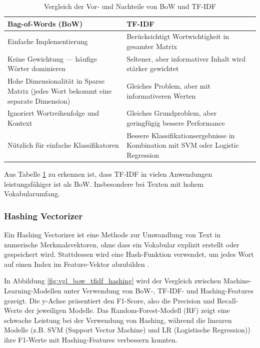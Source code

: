 \begin{table}[!ht]
    \centering
        \begin{tabular}{|p{6.6cm}|p{6.6cm}|}
            \hline
            \textbf{Bag-of-Words (BoW)} & \textbf{TF-IDF} \\
            \hline
            Einfache Implementierung \cite{cichosz2018forum} & Berücksichtigt Wortwichtigkeit in gesamter Matrix  \cite{elov2023uzbek} \\
            \hline
            Keine Gewichtung — häufige Wörter dominieren & Seltener, aber informativer Inhalt wird stärker gewichtet \cite{das2023tfidf} \\
            \hline
            Hohe Dimensionalität in Sparse Matrix (jedes Wort bekommt eine separate Dimension) \cite{ibm_bow} & Gleiches Problem, aber mit informativeren Werten \cite{alzami2020tfidf} \\
            \hline
            Ignoriert Wortreihenfolge und Kontext \cite{umar2022sentiment} & Gleiches Grundproblem, aber geringfügig bessere Performance \cite{parmar2024stacking} \\
            \hline
            Nützlich für einfache Klassifikatoren & Bessere Klassifikationsergebnisse in Kombination mit SVM oder Logistic Regression \cite{iyer2024sentiment} \\
            \hline
        \end{tabular}
    \caption{Vergleich der Vor- und Nachteile von BoW und TF-IDF}
    \label{tab:vergleich}
\end{table}

Aus Tabelle \ref{tab:vergleich} zu erkennen ist, dass TF-IDF in vielen Anwendungen leistungsfähiger ist als BoW. Insbesondere bei Texten mit hohem Vokabularumfang.

\subsubsection{Hashing Vectorizer}

Ein Hashing Vectorizer ist eine Methode zur Umwandlung von Text in numerische Merkmalsvektoren, ohne dass ein Vokabular explizit 
erstellt oder gespeichert wird. Stattdessen wird eine Hash-Funktion verwendet, um jedes Wort auf einen Index im Feature-Vektor abzubilden \cite{Buddhadev2025}.

In Abbildung \ref{fig:vgl_bow_tfidf_hashing} wird der Vergleich zwischen Machine-Learning-Modellen unter Verwendung von BoW-, TF-IDF- und
Hashing-Features gezeigt. Die y-Achse präsentiert den F1-Score, also die Precision und Recall-Werte der jeweiligen Modelle.
Das Random-Forest-Modell (RF) zeigt eine schwache Leistung bei der Verwendung von Hashing, während die linearen Modelle 
(z.B. SVM (Support Vector Machine) und LR (Logistische Regression)) ihre F1-Werte mit Hashing-Features verbessern konnten. 

